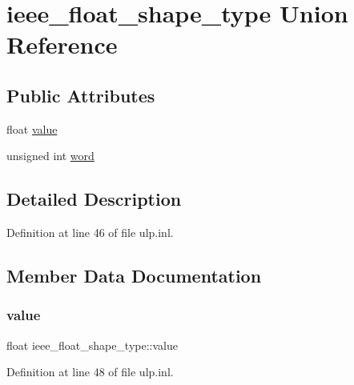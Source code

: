 \hypertarget{unionieee__float__shape__type}{}\section{ieee\+\_\+float\+\_\+shape\+\_\+type Union Reference}
\label{unionieee__float__shape__type}
\subsection*{Public Attributes}
\begin{DoxyCompactItemize}
\item 
float \hyperlink{unionieee__float__shape__type_aa0c47451f1b974421cbb9e2833ddb68e}{value}
\item 
unsigned int \hyperlink{unionieee__float__shape__type_a49230c21acd672d044f38b1abcbd6071}{word}
\end{DoxyCompactItemize}


\subsection{Detailed Description}


Definition at line 46 of file ulp.\+inl.



\subsection{Member Data Documentation}
\mbox{\label{unionieee__float__shape__type_aa0c47451f1b974421cbb9e2833ddb68e}} 
\subsubsection{\texorpdfstring{value}{value}}
{\footnotesize\ttfamily float ieee\+\_\+float\+\_\+shape\+\_\+type\+::value}



Definition at line 48 of file ulp.\+inl.

\mbox{\label{unionieee__float__shape__type_a49230c21acd672d044f38b1abcbd6071}} 
